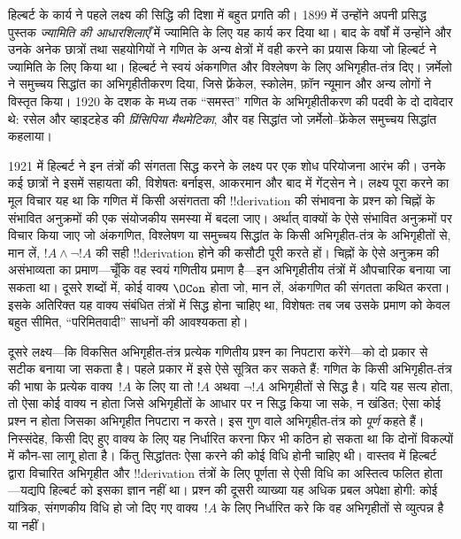 \documentclass[../../../include/open-logic-section]{subfiles}
\begin{document}
हिल्बर्ट के कार्य ने पहले लक्ष्य की सिद्धि की दिशा में बहुत प्रगति की। 1899
में उन्होंने अपनी प्रसिद्ध पुस्तक \emph{ज्यामिति की आधारशिलाएँ} में ज्यामिति
के लिए यह कार्य कर दिया था। बाद के वर्षों में उन्होंने और उनके अनेक छात्रों
तथा सहयोगियों ने गणित के अन्य क्षेत्रों में वही करने का प्रयास किया जो
हिल्बर्ट ने ज्यामिति के लिए किया था। हिल्बर्ट ने स्वयं अंकगणित और विश्लेषण के
लिए अभिगृहीत-तंत्र दिए। ज़र्मेलो ने समुच्चय सिद्धांत का अभिगृहीतीकरण दिया,
जिसे फ्रेंकेल, स्कोलेम, फ़ॉन न्यूमान और अन्य लोगों ने विस्तृत किया। 1920 के
दशक के मध्य तक ``समस्त'' गणित के अभिगृहीतीकरण की पदवी के दो दावेदार थे:
रसेल और व्हाइटहेड की \emph{प्रिंसिपिया मैथमेटिका}, और वह सिद्धांत जो
ज़र्मेलो--फ्रेंकेल समुच्चय सिद्धांत कहलाया।

1921 में हिल्बर्ट ने इन तंत्रों की संगतता सिद्ध करने के लक्ष्य पर एक शोध
परियोजना आरंभ की। उनके कई छात्रों ने इसमें सहायता की, विशेषतः बर्नाइस,
आकरमान और बाद में गेंट्सेन ने। लक्ष्य पूरा करने का मूल विचार यह था कि गणित
में किसी असंगतता की !!{derivation} की संभावना के प्रश्न को चिह्नों के संभावित
अनुक्रमों की एक संयोजकीय समस्या में बदला जाए। अर्थात् वाक्यों के ऐसे संभावित
अनुक्रमों पर विचार किया जाए जो अंकगणित, विश्लेषण या समुच्चय सिद्धांत के किसी
अभिगृहीत-तंत्र के अभिगृहीतों से, मान लें, $!A \land \lnot !A$ की सही
!!{derivation} होने की कसौटी पूरी करते हों। चिह्नों के ऐसे अनुक्रम की
असंभाव्यता का प्रमाण—चूँकि वह स्वयं गणितीय प्रमाण है—इन अभिगृहीतीय तंत्रों में
औपचारिक बनाया जा सकता था। दूसरे शब्दों में, कोई वाक्य $\OCon$ होता जो, मान
लें, अंकगणित की संगतता कथित करता। इसके अतिरिक्त यह वाक्य संबंधित तंत्रों में
सिद्ध होना चाहिए था, विशेषतः तब जब उसके प्रमाण को केवल बहुत सीमित,
``परिमितवादी'' साधनों की आवश्यकता हो।

दूसरे लक्ष्य—कि विकसित अभिगृहीत-तंत्र प्रत्येक गणितीय प्रश्न का निपटारा
करेंगे—को दो प्रकार से सटीक बनाया जा सकता है। पहले प्रकार में इसे ऐसे सूत्रित
कर सकते हैं: गणित के किसी अभिगृहीत-तंत्र की भाषा के प्रत्येक वाक्य~$!A$ के
लिए या तो $!A$ अथवा $\lnot !A$ अभिगृहीतों से सिद्ध है। यदि यह सत्य होता, तो
ऐसा कोई वाक्य न होता जिसे अभिगृहीतों के आधार पर न सिद्ध किया जा सके, न
खंडित; ऐसा कोई प्रश्न न होता जिसका अभिगृहीत निपटारा न करते। इस गुण वाले
अभिगृहीत-तंत्र को \emph{पूर्ण} कहते हैं। निस्संदेह, किसी दिए हुए वाक्य के लिए
यह निर्धारित करना फिर भी कठिन हो सकता था कि दोनों विकल्पों में कौन-सा लागू
होता है। किंतु सिद्धांततः ऐसा करने की कोई विधि होनी चाहिए थी। वास्तव में
हिल्बर्ट द्वारा विचारित अभिगृहीत और !!{derivation} तंत्रों के लिए पूर्णता से
ऐसी विधि का अस्तित्व फलित होता—यद्यपि हिल्बर्ट को इसका ज्ञान नहीं था। प्रश्न
की दूसरी व्याख्या यह अधिक प्रबल अपेक्षा होगी: कोई यांत्रिक, संगणकीय विधि हो
जो दिए गए वाक्य~$!A$ के लिए निर्धारित करे कि वह अभिगृहीतों से व्युत्पन्न है
या नहीं।
\end{document}
